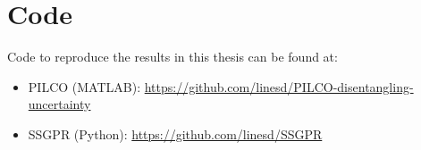 
\chapter{Code}

Code to reproduce the results in this thesis can be found at:
\begin{itemize}
    \item PILCO (MATLAB): \url{https://github.com/linesd/PILCO-disentangling-uncertainty}
    \item SSGPR (Python): \url{https://github.com/linesd/SSGPR}
\end{itemize}